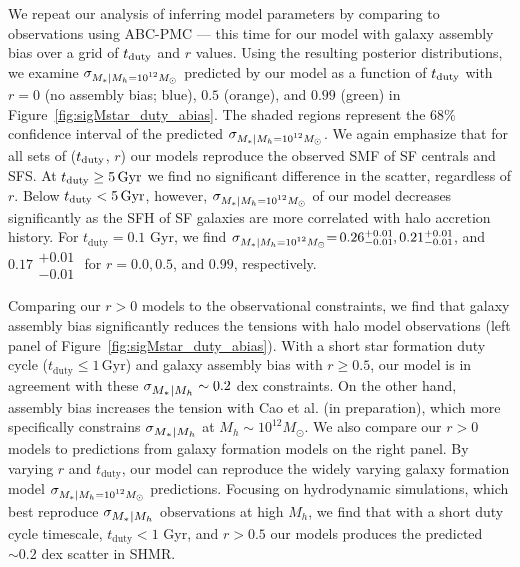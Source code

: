 \documentclass[12pt, letterpaper, preprint, tighten]{aastex62}
\newcommand{\siglogm}{\sigma_{\scaleto{M_*|M_h}{8pt}}}
\newcommand{\sigtwe}{\sigma_{\scaleto{M_*|M_h=10^{12}M_\odot}{8pt}}}
\begin{document}
We repeat our analysis of inferring model parameters by comparing to observations
using ABC-PMC --- this time for our model with galaxy assembly bias over a grid of
$t_{\rm duty}$ and $r$ values. Using the resulting posterior distributions, we
examine $\sigtwe$ predicted by our model as a function of $t_{\rm duty}$ with $r=0$ 
(no assembly bias; blue), $0.5$ (orange), and $0.99$ (green) in 
Figure~\ref{fig:sigMstar_duty_abias}. The shaded regions represent the $68\%$ 
confidence interval of the predicted $\sigtwe$. We again emphasize that for all 
sets of ($t_{\rm duty}$, $r$) our models reproduce the observed SMF of SF centrals 
and SFS. At $t_{\rm duty} \geq 5\,{\rm Gyr}$ we find no significant difference 
in the scatter, regardless of $r$. Below $t_{\rm duty} < 5\,\mathrm{Gyr}$, however, 
$\sigtwe$ of our model decreases significantly as the SFH of SF galaxies are more 
correlated with halo accretion history. For $t_\mathrm{duty} = 0.1$ Gyr, we find
$\sigtwe{=}\,0.26\substack{+0.01\\-0.01},
0.21\substack{+0.01\\-0.01}$, and $0.17\substack{+0.01\\-0.01} $
for $r = 0.0, 0.5$, and $0.99$, respectively.

Comparing our $r > 0$ models to the observational constraints, we find that 
galaxy assembly bias significantly reduces the tensions with halo model observations 
(left panel of Figure~\ref{fig:sigMstar_duty_abias}).
With a short star formation duty cycle ($t_\mathrm{duty} \leq 1\,\mathrm{Gyr}$)
and galaxy assembly bias with $r \ge 0.5$, our model is in agreement with
these $\siglogm \sim 0.2$ dex constraints. On the other hand,
assembly bias increases the tension with
Cao et al. (in preparation), which more specifically constrains $\siglogm$ 
at $M_h\sim 10^{12}M_\odot$. We also compare our $r > 0$ models to
predictions from galaxy formation models on the right panel.
By varying $r$ and $t_\mathrm{duty}$, our model can reproduce the widely varying 
galaxy formation model $\sigtwe$ predictions.
Focusing on hydrodynamic simulations, which best reproduce $\siglogm$
observations at high $M_h$, we find that with a short duty cycle timescale,
$t_\mathrm{duty} < 1$ Gyr, and $r > 0.5$ our models produces the predicted 
$\sim0.2$ dex scatter in SHMR.
\end{document}
